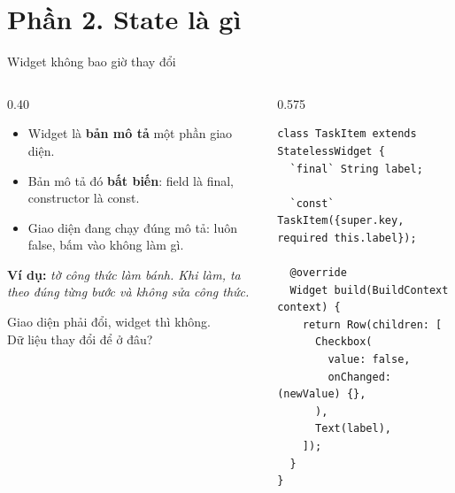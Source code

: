 \documentclass[aspectratio=169,11pt]{beamer}
\newcommand{\ma}[1]{{\ttfamily\small #1}}
\newcommand{\chot}[1]{%
  \par\vspace{2.5mm}%
  \colorbox{nenhop}{\parbox{\dimexpr\linewidth-2\fboxsep\relax}{\raggedright\small\color{chinh}#1}}}
\newcommand{\vidu}[1]{%
  \par\vspace{2.5mm}%
  {\raggedright\small\color{xam}\textbf{Ví dụ:} \itshape #1\par}}
\begin{document}
\section{Phần 2. State là gì}
\begin{frame}[fragile]{Widget không bao giờ thay đổi}
  \begin{columns}[T,onlytextwidth]
    \begin{column}{0.40\textwidth}
      \begin{itemize}
        \item Widget là \textbf{bản mô tả} một phần giao diện.
        \item Bản mô tả đó \textbf{bất biến}: field là \ma{final}, constructor là \ma{const}.
        \item Giao diện đang chạy đúng mô tả: luôn \ma{false}, bấm vào không làm gì.
      \end{itemize}
      \vidu{tờ công thức làm bánh. Khi làm, ta theo đúng từng bước và không sửa công thức.}
      \chot{Giao diện phải đổi, widget thì không.\\ Dữ liệu thay đổi để ở đâu?}
    \end{column}
    \begin{column}{0.575\textwidth}
\begin{lstlisting}
class TaskItem extends StatelessWidget {
  `final` String label;

  `const` TaskItem({super.key, required this.label});

  @override
  Widget build(BuildContext context) {
    return Row(children: [
      Checkbox(
        value: false,
        onChanged: (newValue) {},
      ),
      Text(label),
    ]);
  }
}
\end{lstlisting}
    \end{column}
  \end{columns}
\end{frame}
\end{document}
